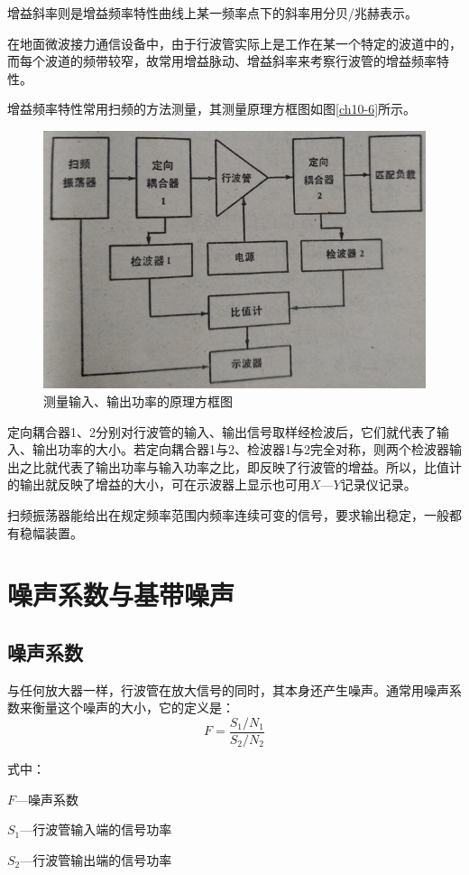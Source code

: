 增益斜率则是增益频率特性曲线上某一频率点下的斜率用分贝/兆赫表示。


在地面微波接力通信设备中，由于行波管实际上是工作在某一个特定的波道中的，而每个波道的频带较窄，故常用增益脉动、增益斜率来考察行波管的增益频率特性。


增益频率特性常用扫频的方法测量，其测量原理方框图如图\ref{ch10-6}所示。

\begin{figure}[phtb]
	\centering
	\includegraphics[width=0.6\linewidth]{figure/ch11-6}
	\caption{测量输入、输出功率的原理方框图}
	\label{ch11-6}
\end{figure}

定向耦合器1、2分别对行波管的输入、输出信号取样经检波后，它们就代表了输入、输出功率的大小。若定向耦合器1与2、检波器1与2完全对称，则两个检波器输出之比就代表了输出功率与输入功率之比，即反映了行波管的增益。所以，比值计的输出就反映了增益的大小，可在示波器上显示也可用$ X—Y $记录仪记录。


扫频振荡器能给出在规定频率范围内频率连续可变的信号，要求输出稳定，一般都有稳幅装置。

\section{噪声系数与基带噪声}
\subsection{噪声系数}


与任何放大器一样，行波管在放大信号的同时，其本身还产生噪声。通常用噪声系数来衡量这个噪声的大小，它的定义是：
\begin{equation} \label{eq:11-2}
	F = \frac{S_1/N_1}{S_2/N_2}
\end{equation}

式中：

$ F $—噪声系数


$ S_1 $—行波管输入端的信号功率


$ S_2 $—行波管输出端的信号功率


